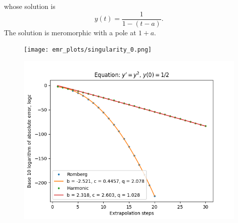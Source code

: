 whose solution is 
\[
y(t) = \frac{1}{1-(t-a)}.
\]
The solution is meromorphic with a pole at \(1+a\).
\begin{figure}[H]
\centering
\begin{minipage}{0.45\textwidth}
\centering
\texttt{[image: emr\_plots/singularity\_0.png]}
\end{minipage}
\begin{minipage}{0.45\textwidth}
\centering
\includegraphics[scale=0.45]{emr_plots/singularity_0_hp_steps.png}
\end{minipage}
\end{figure}

